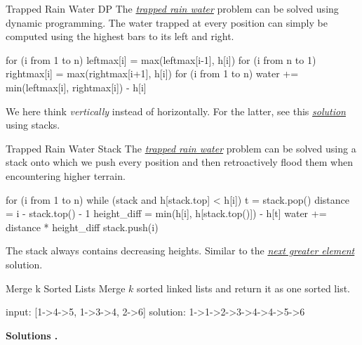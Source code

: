 \documentclass{cognito}
\begin{document}
\begin{note}{Trapped Rain Water DP}
	The \hyperref[note:Trapped Rain Water]{\it trapped rain water} problem can be solved using dynamic
	programming. The water trapped at every position  can simply be computed using the highest bars to its
	left and right.
	
	\begin{largecode}
 for (i from 1 to n)
 	leftmax[i] = max(leftmax[i-1], h[i])
 for (i from n to 1)
 	rightmax[i] = max(rightmax[i+1], h[i])
 for (i from 1 to n)
 	water += min(leftmax[i], rightmax[i]) - h[i]
	\end{largecode}
	\begin{remark}
		We here think {\it vertically} instead of horizontally.
		For the latter, see this \hyperref[note:Trapped Rain Water Stack]{\it solution} using stacks.
	\end{remark}
	\vspace{-5pt}
\end{note}

\begin{note}{Trapped Rain Water Stack}
	The \hyperref[note:Trapped Rain Water]{\it trapped rain water} problem can be solved using a stack
	onto which we push every position  and then retroactively flood them when
	encountering higher terrain.
	
	\begin{largecode}
 for (i from 1 to n)
 	while (stack and h[stack.top] < h[i])
		t = stack.pop()
		distance = i - stack.top() - 1
		height_diff = min(h[i], h[stack.top()]) - h[t]
		water += distance * height_diff
	stack.push(i) 
	\end{largecode}
	\begin{remark} The stack always contains decreasing heights.
		Similar to the \hyperref[note:NGE Solution]{\it next greater element} solution.
	\end{remark}
	\vspace{-5pt}
\end{note}


\begin{note}{Merge k Sorted Lists}
	Merge $k$ sorted linked lists and return it as one sorted list.
	
	\begin{largecode}
 input: [1->4->5, 1->3->4, 2->6]
 solution: 1->1->2->3->4->4->5->6
	\end{largecode}
	\bf Solutions \hyperref[note:Merge Sorted Lists with Max Heap]{\solutionref} \hyperref[note:Divide and Merge Sorted Lists]{\solutionref}.
\end{note}
\end{document}
